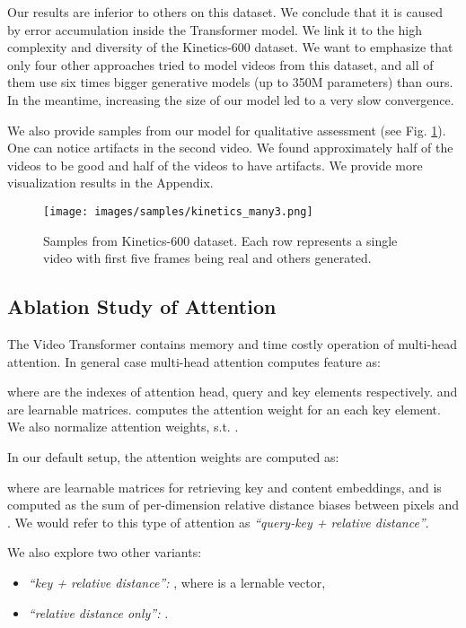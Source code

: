 \documentclass{article}
\newenvironment{itemizetight}
{\vspace{-.5\baselineskip}\begin{itemize}\setlength{\itemsep}{-.25\baselineskip}}
{\end{itemize}\vspace{-.5\baselineskip}}
\begin{document}
Our results are inferior to others on this dataset. We conclude that it is caused by error accumulation inside the Transformer model. We link it to the high complexity and diversity of the Kinetics-600 dataset. We want to emphasize that only four other approaches tried to model videos from this dataset, and all of them use six times bigger generative models (up to 350M parameters) than ours. In the meantime, increasing the size of our model led to a very slow convergence.

We also provide samples from our model for qualitative assessment (see Fig. \ref{fig:kin_samples}). One can notice artifacts in the second video. We found approximately half of the videos to be good and half of the videos to have artifacts. We provide more visualization results in the Appendix.

\begin{figure}[!hbtp]
\centering
\texttt{[image: images/samples/kinetics\_many3.png]}
\caption{Samples from Kinetics-600 dataset. Each row represents a single video with first five frames being real and others generated.} \label{fig:kin_samples}
\end{figure}

\subsection{Ablation Study of Attention}

The Video Transformer contains memory and time costly operation of multi-head attention. In general case multi-head attention computes feature  as:



where  are the indexes of attention head, query and key elements respectively.  and  are learnable matrices.  computes the attention weight for an each key element. We also normalize attention weights, s.t. .

In our default setup, the attention weights are computed as:



where  are learnable matrices for retrieving key and content embeddings, and  is computed as the sum of per-dimension relative distance biases between pixels  and . We would refer to this type of attention as \textit{``query-key + relative distance''}.

We also explore two other variants:
\begin{itemizetight}
    \item \textit{``key + relative distance'':} , where  is a lernable vector,
    \item \textit{``relative distance only'':} .
\end{itemizetight}
\end{document}
